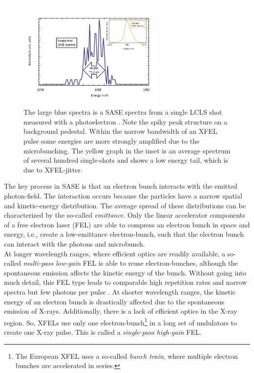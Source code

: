 \begin{figure}
	\centering
		\includegraphics[width=0.65\textwidth]{images/SASE-spectra.png}
	\caption[SASE single-shot and average spectra.]{The large blue spectra is a SASE spectra from a single LCLS shot measured with a photoelectron \citep[see][]{Bucher-2014-Unpublished}. Note the spiky peak structure on a background pedestal. Within the narrow bandwidth of an XFEL pulse some energies are more strongly amplified due to the microbunching. The yellow graph in the inset is an average spectrum of several hundred single-shots and shows a low energy tail, which is due to XFEL-jitter.}
	\label{fig:SASE-spectra}
\end{figure}
The key process in SASE is that an electron bunch interacts with the emitted photon-field. The interaction occurs because the particles have a narrow spatial and kinetic-energy distribution. The average spread of these distributions can be characterized by the so-called \textit{emittance}. Only the linear accelerator components of a free electron laser (FEL) are able to compress an electron bunch in space and energy, i.e., create a low-emittance electron-bunch, such that the electron bunch can interact with the photons and microbunch.\\[1\baselineskip]
%
At longer wavelength ranges, where efficient optics are readily available, a so-called \textit{multi-pass low-gain} FEL is able to reuse electron-bunches, although the spontaneous emission affects the kinetic energy of the bunch. Without going into much detail, this FEL type leads to comparable high repetition rates and narrow spectra but few photons per pulse \citep{Kim-2008-PRL}. At shorter wavelength ranges, the kinetic energy of an electron bunch is drastically affected due to the spontaneous emission of X-rays. Additionally, there is a lack of efficient optics in the X-ray region. So, XFELs use only one electron-bunch\footnote{The European XFEL uses a so-called \textit{bunch train}, where multiple electron bunches are accelerated in series.} in a long set of undulators to create one X-ray pulse. This is called a \textit{single-pass high-gain} FEL.
%
%
%
%
